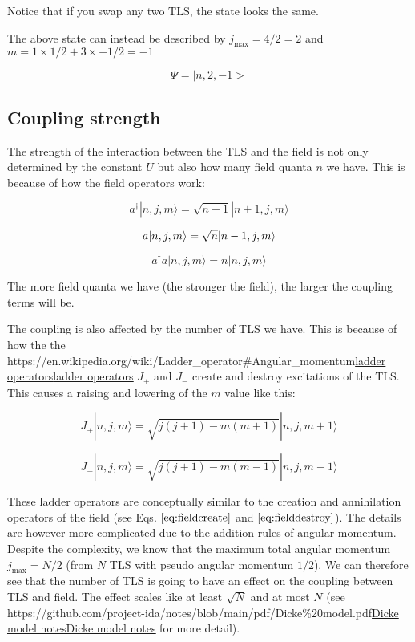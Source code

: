 \documentclass[
]{article}
\let\oldhref\href
\renewcommand{\href}[2]{\ifx#1\urlprefix\oldhref{#1}{#2}\else\uline{\oldhref{#1}{#2}}\fi}
\renewcommand{\[}{\begin{equation}}
\renewcommand{\]}{\end{equation}}
\begin{document}
Notice that if you swap any two TLS, the state looks the same.

The above state can instead be described by \(j_{\max}= 4/2  = 2\) and
\(m = 1\times 1/2 + 3\times -1/2 =-1\)

\[
\Psi = |n,2,-1>
\]

\subsection{Coupling strength}\label{coupling-strength}

The strength of the interaction between the TLS and the field is not
only determined by the constant \(U\) but also how many field quanta
\(n\) we have. This is because of how the field operators work:

\[
a^{\dagger} |n,j,m\rangle = \sqrt{n+1}|n+1,j,m\rangle
\label{eq:fieldcreate}
\]

\[
a |n,j,m\rangle = \sqrt{n}|n-1,j,m\rangle \\
\label{eq:fielddestroy}
\]

\[
a^{\dagger}a |n,j,m\rangle = n|n,j,m\rangle
\]

The more field quanta we have (the stronger the field), the larger the
coupling terms will be.

The coupling is also affected by the number of TLS we have. This is
because of how the the
\href{https://en.wikipedia.org/wiki/Ladder_operator\#Angular_momentum}{ladder
operators} \(J_{+}\) and \(J_{-}\) create and destroy excitations of the
TLS. This causes a raising and lowering of the \(m\) value like this:

\[
J_+ |n, j, m\rangle  =  \sqrt{j(j + 1) - m(m + 1)} |n, j, m + 1\rangle
\]

\[
J_- |n, j, m\rangle =  \sqrt{j(j + 1) - m(m - 1)} |n, j, m - 1\rangle
\]

These ladder operators are conceptually similar to the creation and
annihilation operators of the field (see Eqs. \(\ref{eq:fieldcreate}\)
and \(\ref{eq:fielddestroy}\)). The details are however more complicated
due to the addition rules of angular momentum. Despite the complexity,
we know that the maximum total angular momentum \(j_{\max} = N/2\) (from
\(N\) TLS with pseudo angular momentum \(1/2\)). We can therefore see
that the number of TLS is going to have an effect on the coupling
between TLS and field. The effect scales like at least \(\sqrt{N}\) and
at most \(N\) (see
\href{https://github.com/project-ida/notes/blob/main/pdf/Dicke\%20model.pdf}{Dicke
model notes} for more detail).
\end{document}
